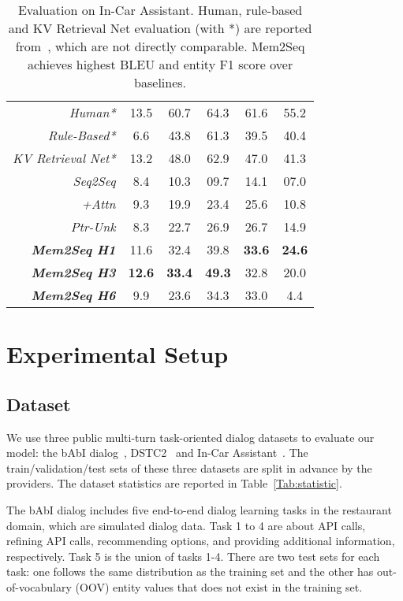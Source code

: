 \documentclass[11pt,a4paper]{article}
\begin{document}
\begin{table*}[t]
\begin{minipage}{0.58\textwidth}
{\begin{tabular}{r|c|c|ccc}
\textit{Human*} & 13.5 & 60.7 & 64.3 & 61.6 & 55.2  \\
\textit{Rule-Based*} & 6.6 & 43.8 & 61.3 & 39.5 & 40.4 \\ 
\textit{KV Retrieval Net*} & 13.2 & 48.0 & 62.9 & 47.0 & 41.3 \\ \hline\hline
\textit{Seq2Seq} & 8.4 & 10.3 & 09.7 & 14.1 & 07.0  \\
\textit{+Attn} & 9.3 & 19.9 & 23.4 & 25.6 & 10.8  \\
\textit{Ptr-Unk}  & 8.3 & 22.7 & 26.9 & 26.7 & 14.9  \\ \hline
\textit{\textbf{Mem2Seq H1}} & 11.6 & 32.4 & 39.8 & \textbf{33.6} & \textbf{24.6} \\
\textit{\textbf{Mem2Seq H3}} & \textbf{12.6} & \textbf{33.4} & \textbf{49.3} & 32.8 & 20.0  \\
\textit{\textbf{Mem2Seq H6}} & 9.9 & 23.6 & 34.3 & 33.0 & 4.4 \\
\hline
\end{tabular}}
\setlength{\abovecaptionskip}{-3pt} 
\caption{Evaluation on In-Car Assistant. Human, rule-based and KV Retrieval Net evaluation (with *) are reported from~\cite{ericKVR2017}, which are not directly comparable. Mem2Seq achieves highest BLEU and entity F1 score over baselines.}
\label{TB:INCAR}
\end{minipage}
\end{table*}   
\section{Experimental Setup}

\subsection{Dataset}
We use three public multi-turn task-oriented dialog datasets to evaluate our model: the bAbI dialog~\cite{bordes2016learning}, DSTC2~\cite{henderson2014second} and In-Car Assistant~\cite{ericKVR2017}. The train/validation/test sets of these three datasets are split in advance by the providers. The dataset statistics are reported in Table~\ref{Tab:statistic}. 

The bAbI dialog includes five end-to-end dialog learning tasks in the restaurant domain, which are simulated dialog data. Task 1 to 4 are about API calls, refining API calls, recommending options, and providing additional information, respectively. Task 5 is the union of tasks 1-4. There are two test sets for each task: one follows the same distribution as the training set and the other has out-of-vocabulary (OOV) entity values that does not exist in the training set.
\end{document}
